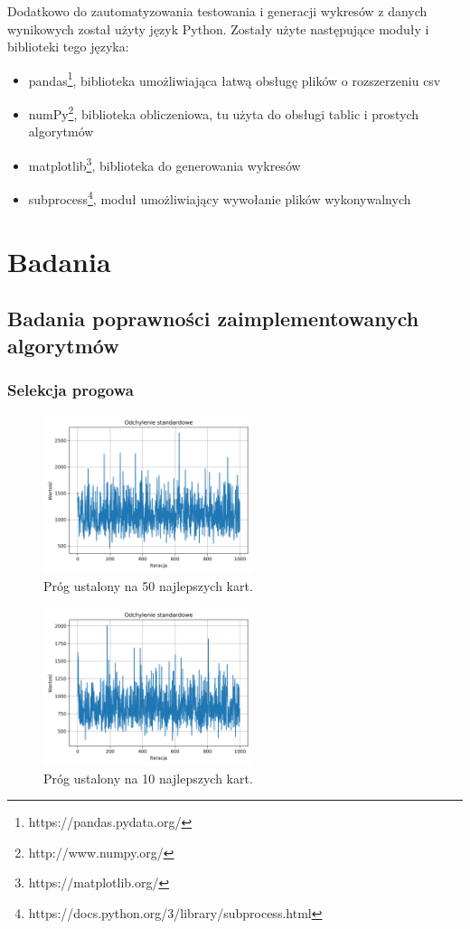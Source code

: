 \documentclass[12pt]{article}
\begin{document}
Dodatkowo do zautomatyzowania testowania i generacji wykresów z danych wynikowych został użyty język Python. Zostały użyte następujące moduły i biblioteki tego języka:

\begin{itemize}
	\item{pandas\footnote{https://pandas.pydata.org/}, biblioteka umożliwiająca łatwą obsługę plików o rozszerzeniu csv}
	\item{numPy\footnote{http://www.numpy.org/}, biblioteka obliczeniowa, tu użyta do obsługi tablic i prostych algorytmów} 
	\item{matplotlib\footnote{https://matplotlib.org/}, biblioteka do generowania wykresów}
	\item{subprocess\footnote{https://docs.python.org/3/library/subprocess.html}, moduł umożliwiający wywołanie plików wykonywalnych} 	
\end{itemize}

\newpage

\section{Badania}
\subsection{Badania poprawności zaimplementowanych algorytmów}
\subsubsection{Selekcja progowa}

\begin{figure}[ht]
	\centering					\includegraphics[width=0.55\textwidth]{threshold_1.png}
	\caption{Próg ustalony na 50 najlepszych kart.}
	\label{fig1}
\end{figure}


\begin{figure}[ht]
	\centering					\includegraphics[width=0.55\textwidth]{threshold_2.png}
	\caption{Próg ustalony na 10 najlepszych kart.}
	\label{fig1}
\end{figure}
\end{document}
